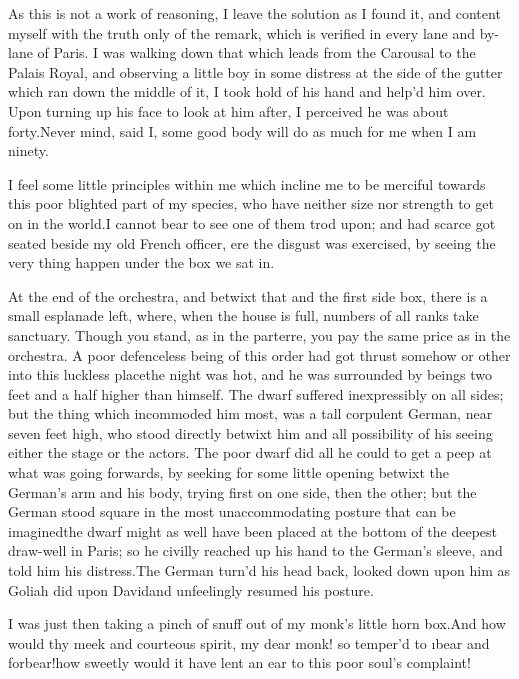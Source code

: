 \documentclass[twoside]{article}
\begin{document}
As this is not a work of reasoning, I leave the solution as I found it,
and content myself with the truth only of the remark, which is verified
in every lane and by-lane of Paris.  I was walking down that which leads
from the Carousal to the Palais Royal, and observing a little boy in some
distress at the side of the gutter which ran down the middle of it, I
took hold of his hand and help’d him over.  Upon turning up his face to
look at him after, I perceived he was about forty.\tsk Never mind, said I,
some good body will do as much for me when I am ninety.

I feel some little principles within me which incline me to be merciful
towards this poor blighted part of my species, who have neither size nor
strength to get on in the world.\tsk I cannot bear to see one of them trod
upon; and had scarce got seated beside my old French officer, ere the
disgust was exercised, by seeing the very thing happen under the box we
sat in.

At the end of the orchestra, and betwixt that and the first side box,
there is a small esplanade left, where, when the house is full, numbers
of all ranks take sanctuary.  Though you stand, as in the parterre, you
pay the same price as in the orchestra.  A poor defenceless being of this
order had got thrust somehow or other into this luckless place\tsk the night
was hot, and he was surrounded by beings two feet and a half higher than
himself.  The dwarf suffered inexpressibly on all sides; but the thing
which incommoded him most, was a tall corpulent German, near seven feet
high, who stood directly betwixt him and all possibility of his seeing
either the stage or the actors.  The poor dwarf did all he could to get a
peep at what was going forwards, by seeking for some little opening
betwixt the German’s arm and his body, trying first on one side, then the
other; but the German stood square in the most unaccommodating posture
that can be imagined\tsk the dwarf might as well have been placed at the
bottom of the deepest draw-well in Paris; so he civilly reached up his
hand to the German’s sleeve, and told him his distress.\tsk The German turn’d
his head back, looked down upon him as Goliah did upon David\tsk and
unfeelingly resumed his posture.

I was just then taking a pinch of snuff out of my monk’s little horn
box.\tsk And how would thy meek and courteous spirit, my dear monk! so
temper’d to \i{bear and forbear!}\tsk how sweetly would it have lent an ear to
this poor soul’s complaint!
\end{document}
